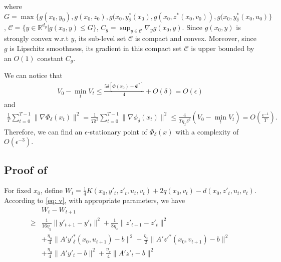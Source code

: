 \documentclass{article}
\newcommand{\Cc}{\mathcal{C}}
\def\R{\mathbb{R}}
\newcommand{\pth}[1]{\left( #1 \right)}
\theoremstyle{plain}
\theoremstyle{definition}
\theoremstyle{remark}
\begin{document}
where $G=\max\{g(x_0, y_0), g(x_0, z_0), g(x_0, y^*_\delta(x_0),g(x_0, z^*(x_0,v_0)), g(x_0, y^*_\delta(x_0,u_0)\}$, $\Cc=\{y\in \R^{d_y}| g(x_0, y)\leq G\}$,
$C_g=\sup_{y\in \Cc}\nabla_y g(x_0,y)$. Since $g(x_0, y)$ is strongly convex w.r.t $y$, its sub-level set $\Cc$ is compact and convex. Moreover, since $g$ is Lipschitz
smoothness, its gradient in this compact set $\Cc$ is upper bounded by an $O(1)$ constant $C_g$.


We can notice that
\begin{align*}
V_0-\min_tV_t\leq   \frac{5\delta [\Phi(x_0)-\Phi^*]}{4}+O(\delta)=O(\epsilon)
\end{align*}
and
\begin{align*}
    \frac{1}{T}\sum_{t=0}^{T-1}\|\nabla \Phi_\delta(x_{t})\|^2= \frac{1}{T\delta^2}\sum_{t=0}^{T-1}\|\nabla \phi_\delta(x_{t})\|^2 \leq \frac{4}{T\eta_x\delta^2}(V_0-\min_tV_t )=O\pth{\frac{\epsilon^{-1}}{T}}.
\end{align*}
Therefore, we can find an $\epsilon$-stationary point of $\Phi_\delta(x)$ with a complexity of $O(\epsilon^{-3})$.


\subsection*{Proof of }
    For fixed $x_0$, define $W_t=\frac{1}{4}K(x_0, y'_t, z'_t, u_t, v_t)+2q(x_0,v_t)-d(x_0,z'_t, u_t, v_t)$. According to \eqref{eq: v}, with appropriate parameters, we have
    \begin{align*}
    &W_t-W_{t+1}\\
    \geq&
    \frac{1}{16\eta_y}\|y'_{t+1}-y'_t\|^2+\frac{1}{8\eta_z}\|z'_{t+1}-z'_t\|^2\\
    &+\frac{\eta_u}{4}\|A'y'^*_\delta(x_0,u_{t+1})-b\|^2+\frac{\eta_v}{2}\|A'z'^*(x_0,v_{t+1})-b\|^2\\
    &+\frac{\eta_u}{4}\|A'y'_t-b\|^2+\frac{\eta_v}{4}\|A'z'_t-b\|^2
    \end{align*}
\end{document}

